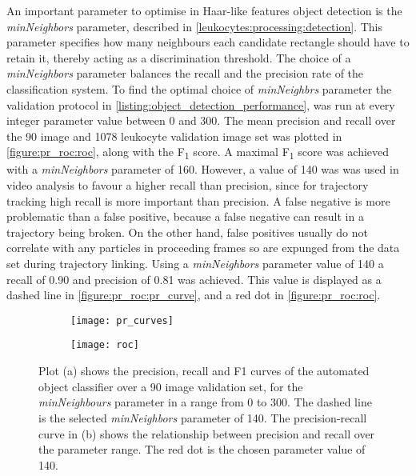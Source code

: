 An important parameter to optimise in Haar-like features object detection is the \emph{minNeighbors} parameter, described in \autoref{leukocytes:processing:detection}. This parameter specifies how many neighbours each candidate rectangle should have to retain it, thereby acting as a discrimination threshold. The choice of a \emph{minNeighbors} parameter balances the recall and the precision rate of the classification system. To find the optimal choice of \emph{minNeighbrs} parameter the validation protocol in \autoref{listing:object_detection_performance}, was run at every integer parameter value between 0 and 300. The mean precision and recall over the 90 image and 1078 leukocyte validation image set was plotted in \autoref{figure:pr_roc:roc}, along with the F\textsubscript{1} score. A maximal F\textsubscript{1} score was achieved with a \emph{minNeighbors} parameter of 160. However, a value of 140 was was used in video analysis to favour a higher recall than precision, since for trajectory tracking high recall is more important than precision. A false negative is more problematic than a false positive, because a false negative can result in a trajectory being broken. On the other hand, false positives usually do not correlate with any particles in proceeding frames so are expunged from the data set during trajectory linking. Using a \emph{minNeighbors} parameter value of 140 a recall of 0.90 and precision of 0.81 was achieved. This value is displayed as a dashed line in \autoref{figure:pr_roc:pr_curve}, and a red dot in \autoref{figure:pr_roc:roc}.

\begin{figure}[htbp]{}
	\centering
	\begin{subfigure}[b]{0.72\linewidth}
		\texttt{[image: pr\_curves]}
		\caption{}
		\label{figure:pr_roc:pr_curve}
	\end{subfigure}
	\begin{subfigure}[b]{0.74\linewidth}
		\texttt{[image: roc]}
		\caption{}
		\label{figure:pr_roc:roc}
	\end{subfigure}
\caption[Precision, recall and F\textsubscript{1} score over parameter range]{Plot (a) shows the precision, recall and F1 curves of the automated object classifier over a 90 image validation set, for the \emph{minNeighbours} parameter in a range from 0 to 300. The dashed line is the selected \emph{minNeighbors} parameter of 140. The precision-recall curve in (b) shows the relationship between precision and recall over the parameter range. The red dot is the chosen parameter value of 140.}
\label{figure:pr_roc}
\end{figure}

